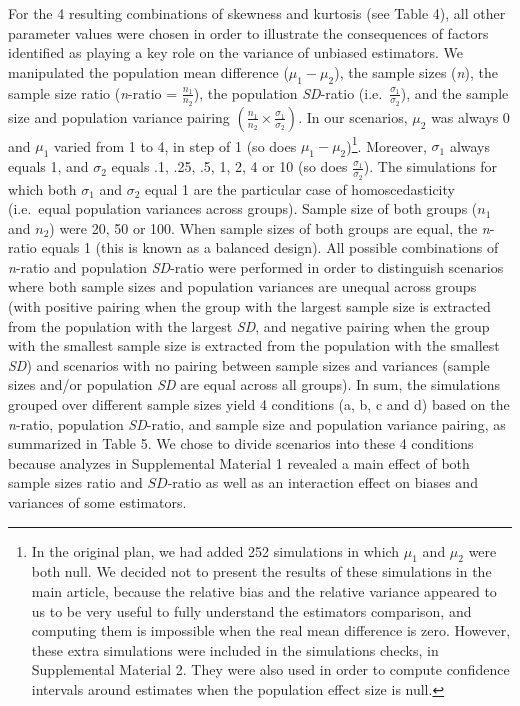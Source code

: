 \documentclass[
  man,floatsintext]{apa6}
\begin{document}
For the 4 resulting combinations of skewness and kurtosis (see Table 4), all other parameter values were chosen in order to illustrate the consequences of factors identified as playing a key role on the variance of unbiased estimators. We manipulated the population mean difference (\(\mu_1-\mu_2\)), the sample sizes (\emph{n}), the sample size ratio (\emph{n}-ratio = \(\frac{n_1}{n_2}\)), the population \emph{SD}-ratio (i.e.~\(\frac{\sigma_1}{\sigma_2}\)), and the sample size and population variance pairing \(\left(\frac{n_1}{n_2}\times\frac{\sigma_1}{\sigma_2} \right)\). In our scenarios, \(\mu_2\) was always 0 and \(\mu_1\) varied from 1 to 4, in step of 1 (so does \(\mu_1-\mu_2\))\footnote{In the original plan, we had added 252 simulations in which $\mu_1$ and $\mu_2$ were both null. We decided not to present the results of these simulations in the main article, because the relative bias and the relative variance appeared to us to be very useful to fully understand the estimators comparison, and computing them is impossible when the real mean difference is zero. However, these extra simulations were included in the simulations checks, in Supplemental Material 2. They were also used in order to compute confidence intervals around estimates when the population effect size is null.}. Moreover, \(\sigma_1\) always equals 1, and \(\sigma_2\) equals .1, .25, .5, 1, 2, 4 or 10 (so does \(\frac{\sigma_1}{\sigma_2}\)). The simulations for which both \(\sigma_1\) and \(\sigma_2\) equal 1 are the particular case of homoscedasticity (i.e.~equal population variances across groups). Sample size of both groups (\(n_1\) and \(n_2\)) were 20, 50 or 100. When sample sizes of both groups are equal, the \emph{n}-ratio equals 1 (this is known as a balanced design). All possible combinations of \emph{n}-ratio and population \emph{SD}-ratio were performed in order to distinguish scenarios where both sample sizes and population variances are unequal across groups (with positive pairing when the group with the largest sample size is extracted from the population with the largest \emph{SD}, and negative pairing when the group with the smallest sample size is extracted from the population with the smallest \emph{SD}) and scenarios with no pairing between sample sizes and variances (sample sizes and/or population \emph{SD} are equal across all groups). In sum, the simulations grouped over different sample sizes yield 4 conditions (a, b, c and d) based on the \emph{n}-ratio, population \emph{SD}-ratio, and sample size and population variance pairing, as summarized in Table 5. We chose to divide scenarios into these 4 conditions because analyzes in Supplemental Material 1 revealed a main effect of both sample sizes ratio and \(SD\)-ratio as well as an interaction effect on biases and variances of some estimators.
\end{document}
